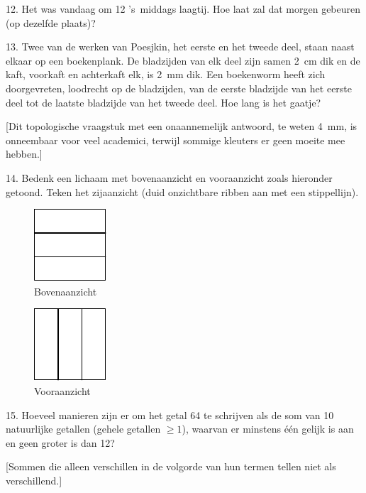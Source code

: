 \begin{problem}{12.}
	Het was vandaag om \SI{12}{\uur} 's~middags laagtij. Hoe laat zal dat morgen gebeuren (op dezelfde plaats)?
\end{problem}

\begin{problem}{13.}
	Twee van de werken van Poesjkin, het eerste en het tweede deel, staan naast elkaar op een boekenplank. De bladzijden van elk deel zijn samen \SI{2}{\cm} dik en de kaft, voorkaft en achterkaft elk, is \SI{2}{\mm} dik. Een boekenworm heeft zich doorgevreten, loodrecht op de bladzijden, van de eerste bladzijde van het eerste deel tot de laatste bladzijde van het tweede deel. Hoe lang is het gaatje?

	[Dit topologische vraagstuk met een onaannemelijk antwoord, te weten \SI{4}{\mm}, is onneembaar voor veel academici, terwijl sommige kleu\-ters er geen moeite mee hebben.]
\end{problem}

\begin{problem}{14.}
	Bedenk een lichaam met bovenaanzicht en vooraanzicht zoals hieronder getoond. Teken het zijaanzicht (duid onzichtbare ribben aan met een stippellijn).
	\begin{figure}
		\footnotesize
		\null\hfill
		\parbox{0.2\linewidth}{\centering\includegraphics{resources/taskbook-99}\\Bovenaanzicht}
		\hfill
		\parbox{0.2\linewidth}{\centering\includegraphics{resources/taskbook-98}\\Vooraanzicht}
		\hfill\null
	\end{figure}
\end{problem}

\begin{problem}{15.}
	Hoeveel manieren zijn er om het getal 64 te schrijven als de som van 10 natuurlijke getallen (gehele getallen $\geq 1$), waarvan er minstens één gelijk is aan en geen groter is dan 12?

	[Sommen die alleen verschillen in de volgorde van hun termen tellen niet als verschillend.]
\end{problem}

